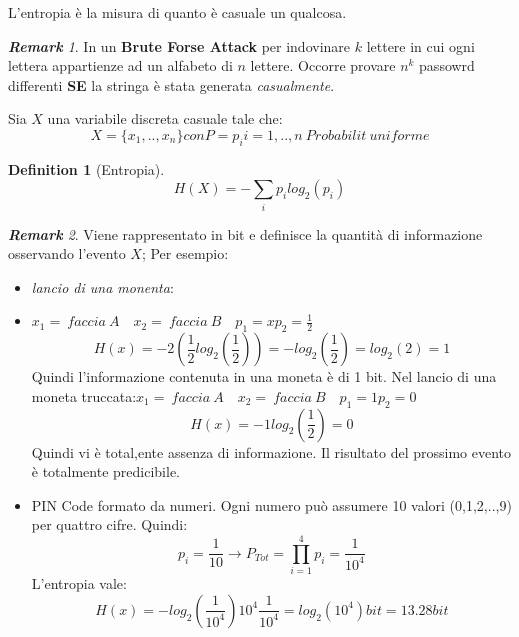 \documentclass{article}
\newtheorem{definition}{Definition}[section]
\theoremstyle{remark}
\newtheorem*{remark}{\textbf{Remark}}
\begin{document}
\begin{enumerate}
    L'entropia è la misura di quanto è casuale un qualcosa.
    \begin{remark}
    In un \textbf{Brute Forse Attack} per indovinare $k$ lettere in cui ogni lettera appartienze ad un alfabeto di $n$ lettere. Occorre provare $n^k$ passowrd differenti \textbf{SE} la stringa è stata generata \emph{casualmente}.
    \end{remark}
    Sia $X$ una variabile discreta casuale tale che:\begin{equation*}
        X=\{x_1,..,x_n\} con P=p_i  i=1,..,n\ Probabilit\ uniforme
    \end{equation*}
    \begin{definition}[Entropia]
    \begin{equation*}
        H(X)=-\sum_ip_ilog_2(p_i)
    \end{equation*}
    \end{definition}
    \begin{remark}
    Viene rappresentato in bit e definisce la quantità di informazione osservando l'evento $X$; Per esempio:\begin{itemize}
             \item \emph{lancio di una monenta}:
            \item $x_1=\ faccia\ A\quad x_2=\ faccia\ B\quad p_1=xp_2=\frac{1}{2}$\begin{equation*}
                H(x)=-2(\frac{1}{2}log_2(\frac{1}{2}))=-log_2(\frac{1}{2})=log_2(2)=1
            \end{equation*}
            Quindi l'informazione contenuta in una moneta è di 1 bit.
            Nel lancio di una moneta truccata:$x_1=\ faccia\ A\quad x_2=\ faccia\ B\quad p_1=1 p_2=0$\begin{equation*}
                H(x)=-1log_2(\frac{1}{2})=0
            \end{equation*}
            Quindi vi è total,ente assenza di informazione. Il risultato del prossimo evento è totalmente predicibile.
            \item PIN Code formato da numeri. Ogni numero può assumere 10 valori (0,1,2,..,9) per quattro cifre. Quindi:\begin{equation*}
                p_i=\frac{1}{10}\rightarrow P_{Tot}=\prod_{i=1}^{4}p_i=\frac{1}{10^4}
            \end{equation*} 
            L'entropia vale:\begin{equation*}
                H(x)=-log_2(\frac{1}{10^4})10^4\frac{1}{10^4}=log_2(10^4) bit = 13.28bit
            \end{equation*}

\end{itemize}
\end{remark}
\end{enumerate}
\end{document}
